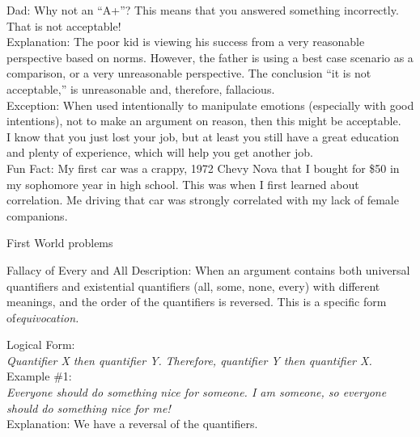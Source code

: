 \documentclass[a4paper,12pt,single,pdftex]{scrbook}
\begin{document}
{    
      Dad:  Why not an “A+”?  This means that you answered something incorrectly.  That is not acceptable!
    \\

    
      Explanation: The poor kid is viewing his success from a very reasonable perspective based on norms.  However, the father is using a best case scenario as a comparison, or a very unreasonable perspective.  The conclusion “it is not acceptable,” is unreasonable and, therefore, fallacious.
    \\

    
      Exception: When used intentionally to manipulate emotions (especially with good intentions), not to make an argument on reason, then this might be acceptable.
    \\

    
      I know that you just lost your job, but at least you still have a great education and plenty of experience, which will help you get another job.
    \\

    
      Fun Fact: My first car was a crappy, 1972 Chevy Nova that I bought for \$50 in my sophomore year in high school. This was when I first learned about correlation. Me driving that car was strongly correlated with my lack of female companions.
    \\

  }


First World problems

Fallacy of Every and All
    Description: When an argument contains both universal quantifiers and existential quantifiers (all, some, none, every) with different meanings, and the order of the quantifiers is reversed. This is a specific form of{\it  equivocation. \newline
}

    
      Logical Form:
    \\

    
      {\em Quantifier X then quantifier Y.} \newline
{\em Therefore, quantifier Y then quantifier X.}
    \\

    
      Example \#1:
    \\

    
      {\em Everyone should do something nice for someone. I am someone, so everyone should do something nice for me!}
    \\

    
      Explanation: We have a reversal of the quantifiers. \newline
\end{document}
